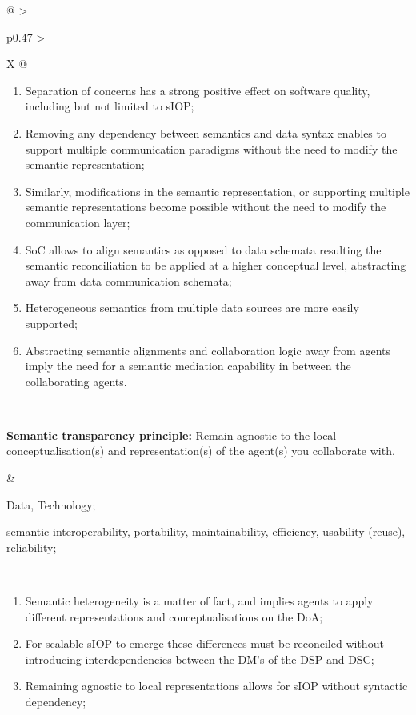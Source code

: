 \begin{xltabular}[l]{\linewidth}{@{} >{\small\raggedright\arraybackslash}p{0.47\linewidth} >{\small\raggedright\arraybackslash}X @{}}
\begin{enumerate}[left=10pt, nosep]
  \item Separation of concerns has a strong positive effect on software quality, including but not limited to sIOP;
  \item Removing any dependency between semantics and data syntax enables to support multiple communication paradigms without the need to modify the semantic representation;
  \item Similarly, modifications in the semantic representation, or supporting multiple semantic representations become possible without the need to modify the communication layer;
  \item SoC allows to align semantics as opposed to data schemata resulting the semantic reconciliation to be applied at a higher conceptual level, abstracting away from data communication schemata;
  \item Heterogeneous semantics from multiple data sources are more easily supported;
  \item Abstracting semantic alignments and collaboration logic away from agents imply the need for a semantic mediation capability in between the collaborating agents.
\end{enumerate} \\
%
%
%
\begin{mmdp}\label{dp:st}{\bfseries Semantic transparency principle:}
\quad Remain agnostic to the local conceptualisation(s) and representation(s) of the agent(s) you collaborate with. \end{mmdp}
&
\begin{description}[labelwidth=3.7cm,leftmargin=3.7cm+1ex,nosep,topsep=2ex,labelsep=1ex,font=\bfseries]
\item[Type of information:] Data, Technology;
\item[Quality attributes:] semantic interoperability, portability, maintainability, efficiency, usability (reuse), reliability;
\end{description}
\\
\begin{enumerate}[left=6pt, nosep]
  \item Semantic heterogeneity is a matter of fact, and implies agents to apply different representations and conceptualisations on the DoA;
  \item For scalable sIOP to emerge these differences must be reconciled without introducing interdependencies between the DM's of the DSP and DSC;
  \item Remaining agnostic to local representations allows for sIOP without syntactic dependency;

\end{enumerate}
\end{xltabular}
